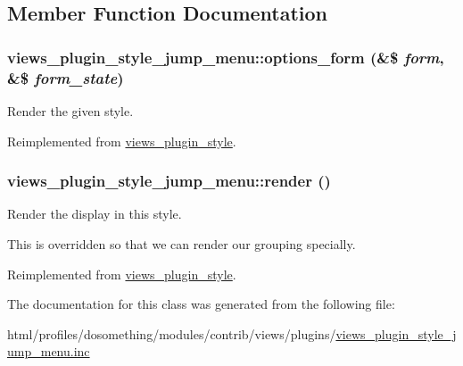 \subsection{Member Function Documentation}
\hypertarget{classviews__plugin__style__jump__menu_ad7158f1d70c97809b44bfa0e10b11709}{
\subsubsection[{options\_\-form}]{\setlength{\rightskip}{0pt plus 5cm}views\_\-plugin\_\-style\_\-jump\_\-menu::options\_\-form (\&\$ {\em form}, \/  \&\$ {\em form\_\-state})}}
\label{classviews__plugin__style__jump__menu_ad7158f1d70c97809b44bfa0e10b11709}
Render the given style. 

Reimplemented from \hyperlink{classviews__plugin__style_afe3d437ff4398315b15c4e60975dbb1c}{views\_\-plugin\_\-style}.\hypertarget{classviews__plugin__style__jump__menu_aebc54d57acea582a05435beccaa26fef}{
\subsubsection[{render}]{\setlength{\rightskip}{0pt plus 5cm}views\_\-plugin\_\-style\_\-jump\_\-menu::render ()}}
\label{classviews__plugin__style__jump__menu_aebc54d57acea582a05435beccaa26fef}
Render the display in this style.

This is overridden so that we can render our grouping specially. 

Reimplemented from \hyperlink{classviews__plugin__style_aa52b618e91b11a7d10ad1feadbc891f1}{views\_\-plugin\_\-style}.

The documentation for this class was generated from the following file:\begin{DoxyCompactItemize}
\item 
html/profiles/dosomething/modules/contrib/views/plugins/\hyperlink{views__plugin__style__jump__menu_8inc}{views\_\-plugin\_\-style\_\-jump\_\-menu.inc}\end{DoxyCompactItemize}
